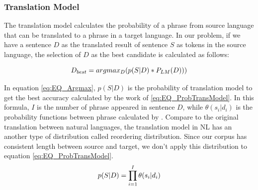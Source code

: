 \subsubsection{Translation Model}
The translation model calculates the probability of a phrase from source language that can be translated to a phrase in a target language. In our problem, if we have a sentence   \({D}\) as the translated result of sentence \({S}\) as tokens in the source language, the selection of \({D}\) as the best candidate is calculated as follows:

\begin{equation} 
\tiny
\label{eq:EQ_Argmax}
 D_{best}=argmax_{D}(p(S|D)*P_{LM}(D)))
\end{equation}

In equation \ref{eq:EQ_Argmax}, \({p(S|D)}\) is the probability of translation model to get the best accuracy calculated by the work of \ref{eq:EQ_ProbTransModel}. In this formula, \(I\) is the number of phrase appeared in sentence \({D}\), while \(\theta ({s_{i}}|{d_{i}})\) is the probability functions between phrase calculated by \cite{Green2014}. Compare to the original translation between natural languages, the translation model in NL has an another type of distribution called reordering distribution. Since our corpus has consistent length between source and target, we don't apply this distribution to equation \ref{eq:EQ_ProbTransModel}.
\begin{equation} 
\tiny
\label{eq:EQ_ProbTransModel}
{p(S|D)=\prod_{i=1}^{I} \theta ({s_{i}}|{d_{i}}) }
\end{equation}


